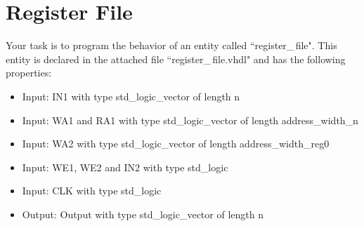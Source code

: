 \documentclass[a4paper,12pt]{article}
\begin{document}
\pagestyle{empty}
\setlength{\parindent}{0em}
\section*{Register File}

Your task is to program the behavior of an entity called ``register\_\,file". This entity is declared in the attached file ``register\_\,file.vhdl" and has the following properties:
\begin{itemize}
\item Input:  IN1 with type std\_logic\_vector  of length {{n}}
\item Input:  WA1 and RA1 with type std\_logic\_vector of length {{address_width_n}}

\item Input:  WA2 with type std\_logic\_vector of length {{address_width_reg0}}


\item Input:  WE1, WE2 and IN2 with type std\_logic

\item Input:  CLK with type std\_logic


\item Output: Output with type std\_logic\_vector of length {{n}}
\end{itemize}
\end{document}
